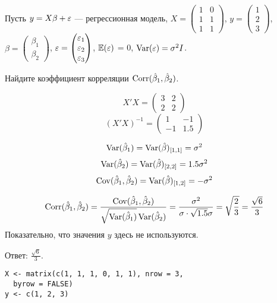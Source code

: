 \begin{problem}
Пусть $y = X\beta + \varepsilon$ — регрессионная модель, $X = \begin{pmatrix} 1 & 0 \\ 1 & 1 \\ 1 & 1 \end{pmatrix}$, $y = \begin{pmatrix} 1 \\ 2 \\ 3 \end{pmatrix}$, $\beta = \begin{pmatrix} \beta_1 \\ \beta_2 \end{pmatrix}$, $\varepsilon = \begin{pmatrix} \varepsilon_1 \\ \varepsilon_2 \\ \varepsilon_3 \end{pmatrix}$, $\mathbb{E}(\varepsilon)$ = 0, $\operatorname{Var}(\varepsilon) = \sigma^2 I$.

Найдите коэффициент корреляции $\operatorname{Corr}(\hat{\beta}_1,\hat{\beta}_2)$.

\begin{sol}
\[X'X=\left(\begin{array}{cc}
3 & 2 \\
2 & 2
\end{array}\right) \]
\[(X'X)^{-1}=\left(\begin{array}{cc}
1 & -1 \\
-1 & 1.5
\end{array}\right) \]

\[\operatorname{Var}(\hat\beta_1)=\operatorname{Var}(\hat\beta)_{[1,1]}=\sigma^2\]
\[\operatorname{Var}(\hat\beta_2)=\operatorname{Var}(\hat\beta)_{[2,2]}=1.5\sigma^2\]
\[\operatorname{Cov}(\hat\beta_1,\hat\beta_2)=\operatorname{Var}(\hat\beta)_{[1,2]}=-\sigma^2\]

\[\operatorname{Corr}(\hat\beta_1,\hat\beta_2)=\frac{\operatorname{Cov}(\hat\beta_1,\hat\beta_2)}{\sqrt{\operatorname{Var}(\hat\beta_1)}\operatorname{Var}(\hat\beta_2)}=\\
\\\frac{\sigma^2}{\sigma\cdot\sqrt{1.5}\sigma}=\sqrt{\frac{2}{3}}=\frac{\sqrt6}{3}\]
Показательно, что значения $y$ здесь не используются.

Ответ: $\frac{\sqrt6}{3}$.

\begin{verbatim}
X <- matrix(c(1, 1, 1, 0, 1, 1), nrow = 3,
  byrow = FALSE)
y <- c(1, 2, 3)
\end{verbatim}


\end{sol}
\end{problem}



